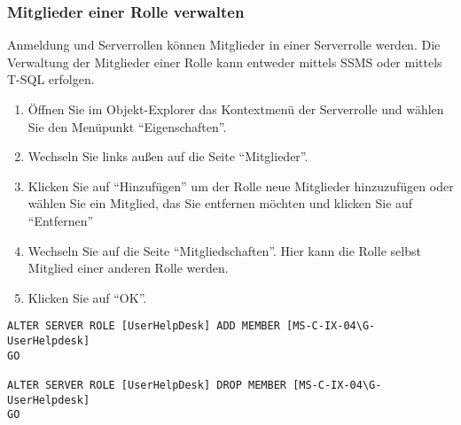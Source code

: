         \subsubsection{Mitglieder einer Rolle verwalten}
          Anmeldung und Serverrollen können Mitglieder in einer Serverrolle
          werden. Die Verwaltung der Mitglieder einer Rolle kann entweder
          mittels SSMS oder mittels T-SQL erfolgen.
          \begin{enumerate}
            \item Öffnen Sie im Objekt-Explorer das Kontextmenü der Serverrolle
            und wählen Sie den Menüpunkt \enquote{Eigenschaften}.
            \item Wechseln Sie links außen auf die Seite \enquote{Mitglieder}.
            \item Klicken Sie auf \enquote{Hinzufügen} um der Rolle neue
            Mitglieder hinzuzufügen oder wählen Sie ein Mitglied, das Sie
            entfernen möchten und klicken Sie auf \enquote{Entfernen}
            \item Wechseln Sie auf die Seite \enquote{Mitgliedschaften}. Hier
            kann die Rolle selbst Mitglied einer anderen Rolle werden.
            \item Klicken Sie auf \enquote{OK}.
          \end{enumerate}
          \begin{lstlisting}[language=ms_sql,caption={Hinzufügen und entfernen
          von Mitgliedern zu/aus einer Serverrolle},label=sql19_03]
ALTER SERVER ROLE [UserHelpDesk] ADD MEMBER [MS-C-IX-04\G-UserHelpdesk]
GO

ALTER SERVER ROLE [UserHelpDesk] DROP MEMBER [MS-C-IX-04\G-UserHelpdesk]
GO
          \end{lstlisting}
          \begin{literaturinternet}
            \item \cite{ms189775}
          \end{literaturinternet}
